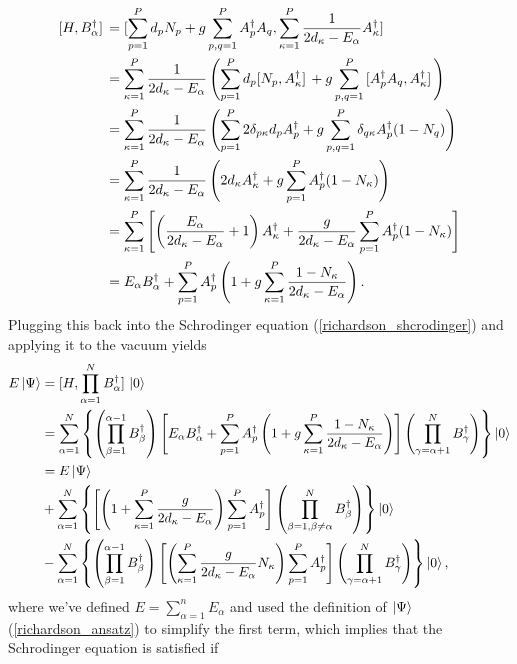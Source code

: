 \documentclass[Dual]{msu-thesis}
\begin{document}
\begin{align}
\comm*{H}{B^\dagger_\alpha}
&=
\comm*{\sum_{p=1}^Pd_pN_p+g\sum_{p,q=1}^PA^\dagger_pA_q}{\sum_{\kappa=1}^P\frac{1}{2d_\kappa-E_\alpha}A^\dagger_\kappa}
\\
&=
\sum_{\kappa=1}^P
\frac{1}{2d_\kappa-E_\alpha}
\left(
\sum_{p=1}^Pd_p\comm*{N_p}{A^\dagger_\kappa}
+
g\sum_{p,q=1}^P\comm*{A^\dagger_pA_q}{A^\dagger_\kappa}
\right)
\\
&=
\sum_{\kappa=1}^P
\frac{1}{2d_\kappa-E_\alpha}
\left(
\sum_{p=1}^P2\delta_{p\kappa}d_pA^\dagger_p
+
g\sum_{p,q=1}^P\delta_{q\kappa}A^\dagger_p(1-N_q)
\right)
\\
&=
\sum_{\kappa=1}^P
\frac{1}{2d_\kappa-E_\alpha}
\left(
2d_\kappa A^\dagger_\kappa
+
g\sum_{p=1}^PA^\dagger_p(1-N_\kappa)
\right)
\\
&=
\sum_{\kappa=1}^P
\left[
\left(\frac{E_\alpha}{2d_\kappa-E_\alpha}+1\right)
A^\dagger_\kappa
+
\frac{g}{2d_\kappa-E_\alpha}
\sum_{p=1}^PA^\dagger_p(1-N_\kappa)
\right]
\\
&=
E_\alpha B^\dagger_\alpha+\sum_{p=1}^PA^\dagger_p
\left(1+g\sum_{\kappa=1}^P\frac{1-N_\kappa}{2d_\kappa-E_\alpha}\right).
\end{align}
Plugging this back into the Schrodinger equation (\ref{richardson_shcrodinger}) and applying it to the vacuum yields
\begin{align}
E\ket{\Psi}
&=
\comm*{H}{\prod_{\alpha=1}^N B^\dagger_{\alpha}}\ket{0}
\nonumber
\\
&=
\sum_{\alpha=1}^N
\left\{
\left(\prod_{\beta=1}^{\alpha-1}B^\dagger_\beta\right)
\left[E_\alpha B^\dagger_\alpha+\sum_{p=1}^PA^\dagger_p
\left(1+g\sum_{\kappa=1}^P\frac{1-N_\kappa}{2d_\kappa-E_\alpha}\right)\right]
\left(\prod_{\gamma=\alpha+1}^NB^\dagger_\gamma\right)
\right\}
\ket{0}
\nonumber
\\
&=
E\ket{\Psi}
\nonumber
\\
&+
\sum_{\alpha=1}^N
\left\{
\left[
\left(1+\sum_{\kappa=1}^P\frac{g}{2d_\kappa-E_\alpha}\right)\sum_{p=1}^PA^\dagger_p
\right]
\left(\prod_{\beta=1,\beta\neq\alpha}^NB^\dagger_\beta\right)
\right\}
\ket{0}
\nonumber
\\
&-
\sum_{\alpha=1}^N
\left\{
\left(\prod_{\beta=1}^{\alpha-1}B^\dagger_\beta\right)
\left[
\left(
\sum_{\kappa=1}^P\frac{g}{2d_\kappa-E_\alpha}N_\kappa
\right)
\sum_{p=1}^PA^\dagger_p
\right]
\left(\prod_{\gamma=\alpha+1}^NB^\dagger_\gamma\right)
\right\}
\ket{0}
,\end{align}
where we've defined $E=\sum_{\alpha=1}^nE_\alpha$ and used the definition of $\ket{\Psi}$ (\ref{richardson_ansatz}) to simplify the first term, which implies that the Schrodinger equation is satisfied if
\end{document}
